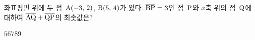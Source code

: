 좌표평면 위에 두 점~$\mathrm{A}(-3,\mkern3mu 2)$, $\mathrm{B}(5,\mkern3mu 4)$가 있다. $\overline{\mathrm{BP}}=3$인 점~$\mathrm{P}$와 $x$축 위의 점~$\mathrm{Q}$에 대하여 $\overline{\mathrm{AQ}}+\overline{\mathrm{QP}}$의 최솟값은?
\begin{choices32}{$5$}{$6$}{$7$}{$8$}{$9$}\end{choices32}
